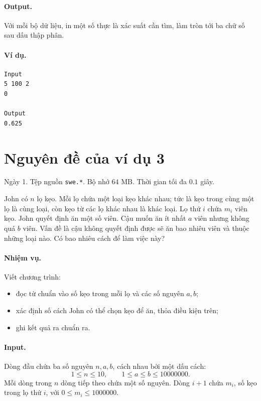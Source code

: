 \documentclass[11pt]{article}
\begin{document}
\paragraph{Output.}
Với mỗi bộ dữ liệu, in một số thực là xác suất cần tìm, làm tròn tới ba chữ
số sau dấu thập phân.

\paragraph{Ví dụ.}
\begin{verbatim}
Input
5 100 2
0

Output
0.625
\end{verbatim}

\section{Nguyên đề của ví dụ 3}

Ngày 1. Tệp nguồn \texttt{swe.*}. Bộ nhớ \(64\) MB. Thời gian tối đa \(0.1\)
giây.

John có \(n\) lọ kẹo. Mỗi lọ chứa một loại kẹo khác nhau; tức là kẹo trong
cùng một lọ là cùng loại, còn kẹo từ các lọ khác nhau là khác loại. Lọ thứ
\(i\) chứa \(m_i\) viên kẹo. John quyết định ăn một số viên. Cậu muốn ăn ít
nhất \(a\) viên nhưng không quá \(b\) viên. Vấn đề là cậu không quyết định
được sẽ ăn bao nhiêu viên và thuộc những loại nào. Có bao nhiêu cách để làm
việc này?

\paragraph{Nhiệm vụ.}
Viết chương trình:
\begin{itemize}
  \item đọc từ chuẩn vào số kẹo trong mỗi lọ và các số nguyên \(a,b\);
  \item xác định số cách John có thể chọn kẹo để ăn, thỏa điều kiện trên;
  \item ghi kết quả ra chuẩn ra.
\end{itemize}

\paragraph{Input.}
Dòng đầu chứa ba số nguyên \(n,a,b\), cách nhau bởi một dấu cách:
\[
  1\le n\le 10,\qquad 1\le a\le b\le 10000000.
\]
Mỗi dòng trong \(n\) dòng tiếp theo chứa một số nguyên. Dòng \(i+1\) chứa
\(m_i\), số kẹo trong lọ thứ \(i\), với \(0\le m_i\le 1000000\).
\end{document}

